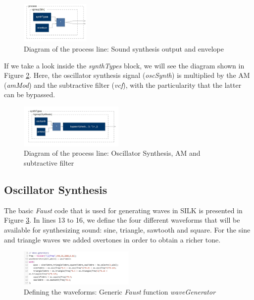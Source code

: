 \documentclass{aes2e}
\begin{document}
\begin{figure}[h]
\centering
\includegraphics[width=0.3\textwidth]{Figures/process.jpg}
\caption{Diagram of the process line: Sound synthesis output and envelope}
\label{fig:process}
\end{figure}

If we take a look inside the \textit{synthTypes} block, we will see the diagram shown in Figure \ref{fig:process1}. Here, the oscillator synthesis signal (\textit{oscSynth}) is multiplied by the AM (\textit{amMod}) and the subtractive filter (\textit{vcf}), with the particularity that the latter can be bypassed.

\begin{figure}[h]
\centering
\includegraphics[width=0.45\textwidth]{Figures/process1.jpg}
\caption{Diagram of the process line: Oscillator Synthesis, AM and subtractive filter}
\label{fig:process1}
\end{figure}

\subsection{Oscillator Synthesis}

The basic \textit{Faust} code that is used for generating waves in SILK is presented in Figure \ref{fig:osc_synth_1}. In lines 13 to 16, we define the four different waveforms that will be available for synthesizing sound: sine, triangle, sawtooth and square. For the sine and triangle waves we added overtones in order to obtain a richer tone.

\begin{figure}[h]
\centering
\includegraphics[width=0.5\textwidth]{Figures/osc_synth_1.jpg}
\caption{Defining the waveforms: Generic \textit{Faust} function \textit{waveGenerator}}
\label{fig:osc_synth_1}
\end{figure}
\end{document}
